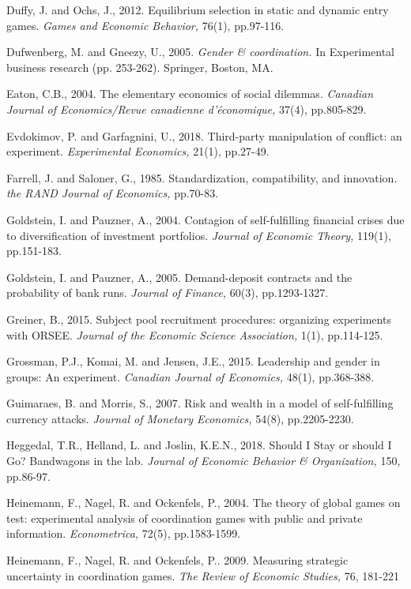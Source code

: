 \documentclass[12pt,english]{article}
\begin{document}
\begin{thebibliography}{10}
\bibitem{} Duffy, J. and Ochs, J., 2012. Equilibrium selection in static and dynamic entry games. \textit{Games and Economic Behavior,} 76(1), pp.97-116.

\bibitem{} Dufwenberg, M. and Gneezy, U., 2005. \textit{Gender & coordination.} In Experimental business research (pp. 253-262). Springer, Boston, MA.

\bibitem{}Eaton, C.B., 2004. The elementary economics of social dilemmas. \textit{Canadian Journal of Economics/Revue canadienne d'\'{e}conomique,} 37(4), pp.805-829.

  Evdokimov, P. and Garfagnini, U., 2018. Third-party manipulation of conflict: an experiment. \textit{Experimental Economics,} 21(1), pp.27-49.

  Farrell, J. and Saloner, G., 1985. Standardization, compatibility, and innovation. \textit{the RAND Journal of Economics,} pp.70-83.

\bibitem{} Goldstein, I. and Pauzner, A., 2004. Contagion of self-fulfilling financial crises due to diversification of investment portfolios. \textit{Journal of Economic Theory,} 119(1), pp.151-183.

\bibitem{} Goldstein, I. and Pauzner, A., 2005. Demand-deposit contracts and the probability of bank runs. \textit{Journal of Finance,} 60(3), pp.1293-1327.


\bibitem{} Greiner, B., 2015. Subject pool recruitment procedures: organizing experiments with ORSEE. \textit{Journal of the Economic Science Association,} 1(1), pp.114-125.

\bibitem{} Grossman, P.J., Komai, M. and Jensen, J.E., 2015. Leadership and gender in groups: An experiment. \textit{Canadian Journal of Economics,} 48(1), pp.368-388.

\bibitem{}  Guimaraes, B. and Morris, S., 2007. Risk and wealth in a model of self-fulfilling currency attacks. \textit{Journal of Monetary Economics,} 54(8), pp.2205-2230.

\bibitem{} Heggedal, T.R., Helland, L. and Joslin, K.E.N., 2018. Should I Stay or should I Go? Bandwagons in the lab. \textit{Journal of Economic Behavior \& Organization,} 150, pp.86-97.

\bibitem{}Heinemann, F., Nagel, R. and Ockenfels, P., 2004. The theory of global games on test: experimental analysis of coordination games with public and private information. \textit{Econometrica, } 72(5), pp.1583-1599.

\bibitem{} Heinemann, F., Nagel, R. and Ockenfels, P.. 2009. Measuring strategic uncertainty in coordination games. \textit{The Review of Economic Studies,}  76, 181-221


\end{thebibliography}
\end{document}
